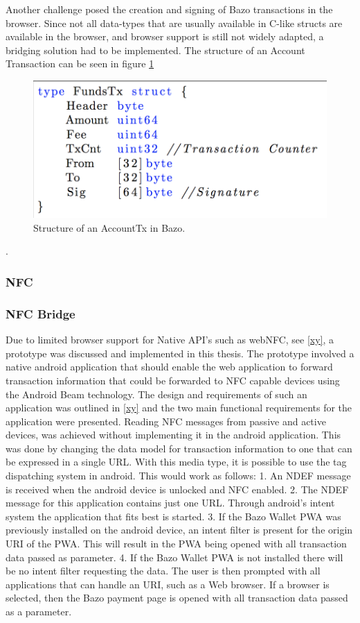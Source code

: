 \documentclass[a4paper]{article}
\begin{document}
Another challenge posed the creation and signing of Bazo transactions in the browser. Since not all data-types that are usually available in C-like structs are available in the browser, and browser support is still not widely adapted, a bridging solution had to be implemented.
The structure of an Account Transaction can be seen in figure \ref{fig:AccountTx}

\begin{figure}
\centering
\includegraphics[width=1\textwidth]{diagrams/AccountTx_struct.png}
\caption{\label{fig:AccountTx}Structure of an AccountTx in Bazo.}
\end{figure}.


\subsubsection{NFC}
\subsubsection{NFC Bridge}
Due to limited browser support for Native API's such as webNFC, see \ref{xy}, a prototype was discussed and implemented in this thesis. The prototype involved a native android application that should enable the web application to forward transaction information that could be forwarded to NFC capable devices using the Android Beam technology.
The design and requirements of such an application was outlined in \ref{xy} and the two main functional requirements for the application were presented.
Reading NFC messages from passive and active devices, was achieved without implementing it in the android application. This was done by changing the data model for transaction information to one that can be expressed in a single URL. With this media type, it is possible to use the tag dispatching system in android. This would work as follows:
1. An NDEF message is received when the android device is unlocked and NFC enabled.
2. The NDEF message for this application contains just one URL. Through android's intent system the application that fits best is started.
3. If the Bazo Wallet PWA was previously installed on the android device, an intent filter is present for the origin URI of the PWA. This will result in the PWA being opened with all transaction data passed as parameter.
4. If the Bazo Wallet PWA is not installed there will be no intent filter requesting the data. The user is then prompted with all applications that can handle an URI, such as a Web browser. If a browser is selected, then the Bazo payment page is opened with all transaction data passed as a parameter.
\end{document}
